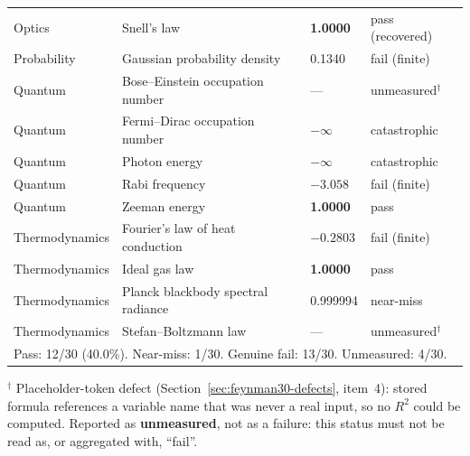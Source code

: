 \documentclass[twoside,11pt]{article}
\newcommand{\Rsq}{R^{2}}
\begin{document}
\begin{longtable}{p{2.3cm}p{6.3cm}p{1.4cm}p{2.5cm}}
Optics & Snell's law & \textbf{1.0000} & pass (recovered) \\
Probability & Gaussian probability density & 0.1340 & fail (finite) \\
Quantum & Bose--Einstein occupation number & --- & unmeasured$^\dagger$ \\
Quantum & Fermi--Dirac occupation number & $-\infty$ & catastrophic \\
Quantum & Photon energy & $-\infty$ & catastrophic \\
Quantum & Rabi frequency & $-3.058$ & fail (finite) \\
Quantum & Zeeman energy & \textbf{1.0000} & pass \\
Thermodynamics & Fourier's law of heat conduction & $-0.2803$ & fail (finite) \\
Thermodynamics & Ideal gas law & \textbf{1.0000} & pass \\
Thermodynamics & Planck blackbody spectral radiance & 0.999994 & near-miss \\
Thermodynamics & Stefan--Boltzmann law & --- & unmeasured$^\dagger$ \\
\midrule
\multicolumn{4}{l}{Pass: 12/30 (40.0\%). Near-miss: 1/30. Genuine fail: 13/30. Unmeasured: 4/30.} \\
\bottomrule
\end{longtable}

{\small $^\dagger$ Placeholder-token defect (Section~\ref{sec:feynman30-defects}, item~4):
stored formula references a variable name that was never a real input, so no
$\Rsq$ could be computed. Reported as \textbf{unmeasured}, not as a failure:
this status must not be read as, or aggregated with, ``fail''.\par}
\end{document}
